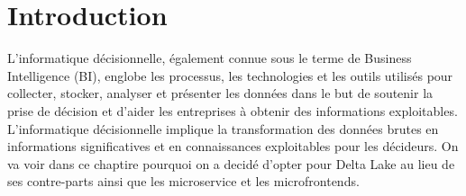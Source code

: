 
\section*{Introduction}

L'informatique décisionnelle, également connue sous le terme de Business Intelligence (BI), englobe les processus, les technologies et les outils utilisés pour collecter, stocker, analyser et présenter les données dans le but de soutenir la prise de décision et d'aider les entreprises à obtenir des informations exploitables. L'informatique décisionnelle implique la transformation des données brutes en informations significatives et en connaissances exploitables pour les décideurs. On va voir dans ce chaptire pourquoi on a decidé d'opter pour Delta Lake au lieu de ses contre-parts ainsi que les microservice et les microfrontends.


